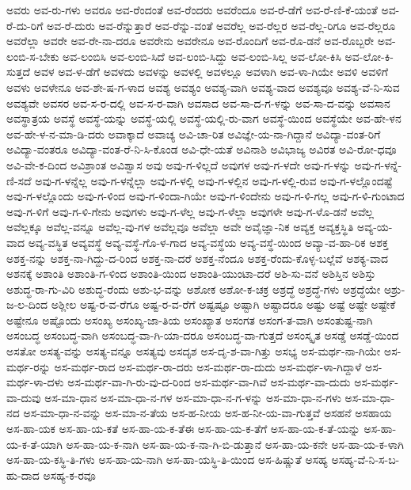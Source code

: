 {ಅವರು
ಅವ-ರು-ಗಳು
ಅವರೂ
ಅವ-ರೆಂದಂತೆ
ಅವ-ರೆಂದರು
ಅವರೆಂದೂ
ಅವ-ರೆ-ಡೆಗೆ
ಅವ-ರೆ-ಣಿ-ಕೆ-ಯಂತೆ
ಅವ-ರೆ-ದು-ರಿಗೆ
ಅವ-ರೆ-ದುರು
ಅವ-ರೆನ್ನುತ್ತಾರೆ
ಅವ-ರೆನ್ನು-ವಂತೆ
ಅವರೆಲ್ಲ
ಅವ-ರೆಲ್ಲರ
ಅವ-ರೆಲ್ಲ-ರಿಗೂ
ಅವ-ರೆಲ್ಲರೂ
ಅವರೆಲ್ಲಾ
ಅವರೇ
ಅವ-ರೇ-ನಾ-ದರೂ
ಅವರೇನು
ಅವರೇನೂ
ಅವ-ರೊಂದಿಗೆ
ಅವ-ರೊ-ಡನೆ
ಅವ-ರೊಬ್ಬರೇ
ಅವ-ಲಂಬಿ-ಸ-ಬೇಕು
ಅವ-ಲಂಬಿಸಿ
ಅವ-ಲಂಬಿ-ಸಿದೆ
ಅವ-ಲಂಬಿ-ಸಿದ್ದು
ಅವ-ಲಂಬಿ-ಸಿಲ್ಲ
ಅವ-ಲೋ-ಕಿಸಿ
ಅವ-ಲೋ-ಕಿ-ಸುತ್ತದೆ
ಅವಳ
ಅವ-ಳ-ಡೆಗೆ
ಅವಳದು
ಅವಳನ್ನು
ಅವಳಲ್ಲಿ
ಅವಳಲ್ಲೂ
ಅವಳಾಗಿ
ಅವ-ಳಾ-ಗಿಯೇ
ಅವಳಿ
ಅವಳಿಗೆ
ಅವಳು
ಅವಳೇನೂ
ಅವ-ಶೇ-ಷ-ಗ-ಳಾದ
ಅವಶ್ಯ
ಅವಶ್ಯಂ
ಅವಶ್ಯ-ವಾಗಿ
ಅವಶ್ಯ-ವಾದ
ಅವಶ್ಯವೂ
ಅವಶ್ಯ-ವೆ-ನಿ-ಸುವ
ಅವಶ್ಯವೇ
ಅವಸರ
ಅವ-ಸ-ರ-ದಲ್ಲಿ
ಅವ-ಸ-ರ-ವಾಗಿ
ಅವಸಾದ
ಅವ-ಸಾ-ದ-ಗ-ಳನ್ನು
ಅವ-ಸಾ-ದ-ವನ್ನು
ಅವಸಾನ
ಅವಸ್ಥಾತ್ರಯ
ಅವಸ್ಥೆ
ಅವಸ್ಥೆ-ಯನ್ನು
ಅವಸ್ಥೆ-ಯಲ್ಲಿ
ಅವಸ್ಥೆ-ಯಲ್ಲಿ-ರು-ವಾಗ
ಅವಸ್ಥೆ-ಯಿಂದ
ಅವಸ್ಥೆಯೇ
ಅವ-ಹೇ-ಳನ
ಅವ-ಹೇ-ಳ-ನ-ಮಾ-ಡಿ-ದರು
ಅವಾಕ್ಕಾದೆ
ಅವಾಚ್ಯ
ಅವಿ-ಚಾ-ರಿತ
ಅವಿಜ್ಞೇ-ಯ-ನಾ-ಗಿದ್ದಾನೆ
ಅವಿದ್ಯಾ-ವಂತ-ರಿಗೆ
ಅವಿದ್ಯಾ-ವಂತರೂ
ಅವಿದ್ಯಾ-ವಂತ-ರೆ-ನಿ-ಸಿ-ಕೊಂಡ
ಅವಿ-ಧೇ-ಯತೆ
ಅವಿನಾಶಿ
ಅವಿಭಾಜ್ಯ
ಅವಿರತ
ಅವಿ-ರೋ-ಧವೂ
ಅವಿ-ವೇ-ಕ-ದಿಂದ
ಅವಿಶ್ರಾಂತ
ಅವಿಶ್ವಾಸ
ಅವು
ಅವು-ಗ-ಳಿಲ್ಲದೆ
ಅವುಗಳ
ಅವು-ಗ-ಳದೇ
ಅವು-ಗ-ಳನ್ನು
ಅವು-ಗ-ಳನ್ನೆ-ಣಿ-ಸದೆ
ಅವು-ಗ-ಳನ್ನೆಲ್ಲ
ಅವು-ಗ-ಳನ್ನೆಲ್ಲಾ
ಅವು-ಗ-ಳಲ್ಲಿ
ಅವು-ಗ-ಳಲ್ಲಿನ
ಅವು-ಗ-ಳಲ್ಲಿ-ರುವ
ಅವು-ಗ-ಳಲ್ಲೊಂದಷ್ಟೆ
ಅವು-ಗ-ಳಲ್ಲೊಂದು
ಅವು-ಗ-ಳಿಂದ
ಅವು-ಗ-ಳಿಂದಾ-ಗಿಯೇ
ಅವು-ಗ-ಳಿಂದೇನು
ಅವು-ಗ-ಳಿ-ಗಲ್ಲ
ಅವು-ಗ-ಳಿ-ಗುಂಟಾದ
ಅವು-ಗ-ಳಿಗೆ
ಅವು-ಗ-ಳಿ-ಗೇನು
ಅವುಗಳು
ಅವು-ಗ-ಳೆಲ್ಲ
ಅವು-ಗ-ಳೆಲ್ಲಾ
ಅವುಗಳೇ
ಅವು-ಗ-ಳೊ-ಡನೆ
ಅವೆಲ್ಲ
ಅವೆಲ್ಲಕ್ಕೂ
ಅವೆಲ್ಲ-ವನ್ನೂ
ಅವೆಲ್ಲ-ವು-ಗಳ
ಅವೆಲ್ಲವೂ
ಅವೆಲ್ಲಾ
ಅವೇ
ಅವೈಜ್ಞಾ-ನಿಕ
ಅವ್ಯಕ್ತ
ಅವ್ಯಕ್ತಸ್ಥಿತಿ
ಅವ್ಯ-ಯ-ವಾದ
ಅವ್ಯ-ವಸ್ಥಿತ
ಅವ್ಯವಸ್ಥೆ
ಅವ್ಯ-ವಸ್ಥೆ-ಗೊ-ಳ-ಗಾದ
ಅವ್ಯ-ವಸ್ಥೆಯ
ಅವ್ಯ-ವಸ್ಥೆ-ಯಿಂದ
ಅವ್ಯಾ-ವ-ಹಾ-ರಿಕ
ಅಶಕ್ತ
ಅಶಕ್ತ-ನನ್ನು
ಅಶಕ್ತ-ನಾ-ಗಿದ್ದು-ದ-ರಿಂದ
ಅಶಕ್ತ-ನಾ-ದರೆ
ಅಶಕ್ತ-ನೆಂದೂ
ಅಶಕ್ತ-ರೆಂದು-ಕೊಳ್ಳ-ಬಲ್ಲೆವೆ
ಅಶಕ್ಯ-ವಾದ
ಅಶನಕ್ಕೆ
ಅಶಾಂತಿ
ಅಶಾಂತಿ-ಗ-ಳಿಂದ
ಅಶಾಂತಿ-ಯಿಂದ
ಅಶಾಂತಿ-ಯುಂಟಾ-ದರೆ
ಅಶಿ-ಸು-ವನೆ
ಅಶಿಸ್ತಿನ
ಅಶಿಸ್ತು
ಅಶುದ್ಧ-ರಾ-ಗು-ವಿರಿ
ಅಶುದ್ಧ-ರೆಂದು
ಅಶು-ಭ-ವನ್ನು
ಅಶೋಕ
ಅಶೋ-ಕ-ಚಕ್ರ
ಅಶ್ರದ್ಧೆ
ಅಶ್ರದ್ಧೆ-ಗಳು
ಅಶ್ರದ್ಧೆಯೇ
ಅಶ್ರು-ಜ-ಲ-ದಿಂದ
ಅಶ್ಲೀಲ
ಅಷ್ಟ-ರ-ವ-ರೆಗೂ
ಅಷ್ಟ-ರ-ವ-ರೆಗೆ
ಅಷ್ಟಷ್ಟೂ
ಅಷ್ಟಾಗಿ
ಅಷ್ಟಾದರೂ
ಅಷ್ಟು
ಅಷ್ಟೆ
ಅಷ್ಟೇ
ಅಷ್ಟೇಕೆ
ಅಷ್ಟೇನೂ
ಅಷ್ಟೊಂದು
ಅಸಂಖ್ಯ
ಅಸಂಖ್ಯ-ಜಾ-ತಿಯ
ಅಸಂಖ್ಯಾತ
ಅಸಂಗತ
ಅಸಂಗ-ತ-ವಾಗಿ
ಅಸಂತುಷ್ಟ-ನಾಗಿ
ಅಸಂಬದ್ಧ
ಅಸಂಬದ್ಧ-ವಾಗಿ
ಅಸಂಬದ್ಧ-ವಾ-ಗಿ-ಯಾ-ದರೂ
ಅಸಂಬದ್ಧ-ವಾ-ಗುತ್ತದೆ
ಅಸಂಸ್ಕೃತ
ಅಸಡ್ಡೆ
ಅಸಡ್ಡೆ-ಯಿಂದ
ಅಸತೋ
ಅಸತ್ಯ-ವನ್ನು
ಅಸತ್ಯ-ವನ್ನೂ
ಅಸತ್ಯವು
ಅಸದೃಶ
ಅಸ-ದೃ-ಶ-ವಾ-ಗಿತ್ತು
ಅಸಭ್ಯ
ಅಸ-ಮರ್ಥ-ನಾ-ಗಿಯೇ
ಅಸ-ಮರ್ಥ-ರನ್ನು
ಅಸ-ಮರ್ಥ-ರಾದ
ಅಸ-ಮರ್ಥ-ರಾ-ದರು
ಅಸ-ಮರ್ಥ-ರಾ-ದುದು
ಅಸ-ಮರ್ಥ-ಳಾ-ಗಿದ್ದಾಳೆ
ಅಸ-ಮರ್ಥ-ಳಾ-ದಳು
ಅಸ-ಮರ್ಥ-ವಾ-ಗಿ-ರು-ವು-ದ-ರಿಂದ
ಅಸ-ಮರ್ಥ-ವಾ-ಗಿವೆ
ಅಸ-ಮರ್ಥ-ವಾ-ದುದು
ಅಸ-ಮರ್ಥ-ವಾ-ದುವು
ಅಸ-ಮಾ-ಧಾನ
ಅಸ-ಮಾ-ಧಾ-ನ-ಗಳ
ಅಸ-ಮಾ-ಧಾ-ನ-ಗ-ಳನ್ನು
ಅಸ-ಮಾ-ಧಾ-ನ-ಗಳು
ಅಸ-ಮಾ-ಧಾ-ನದ
ಅಸ-ಮಾ-ಧಾ-ನ-ವನ್ನು
ಅಸ-ಮಾ-ನ-ತೆಯ
ಅಸ-ಹ-ನೀಯ
ಅಸ-ಹ-ನೀ-ಯ-ವಾ-ಗುತ್ತವೆ
ಅಸಹನೆ
ಅಸಹಾಯ
ಅಸ-ಹಾ-ಯಕ
ಅಸ-ಹಾ-ಯ-ಕತೆ
ಅಸ-ಹಾ-ಯ-ಕ-ತೆಈ
ಅಸ-ಹಾ-ಯ-ಕ-ತೆಗೆ
ಅಸ-ಹಾ-ಯ-ಕ-ತೆ-ಯನ್ನು
ಅಸ-ಹಾ-ಯ-ಕ-ತೆ-ಯಾಗಿ
ಅಸ-ಹಾ-ಯ-ಕ-ನಾಗಿ
ಅಸ-ಹಾ-ಯ-ಕ-ನಾ-ಗಿ-ಬಿ-ಡುತ್ತಾನೆ
ಅಸ-ಹಾ-ಯ-ಕನೇ
ಅಸ-ಹಾ-ಯ-ಕ-ಳಾಗಿ
ಅಸ-ಹಾ-ಯ-ಕಸ್ಥಿ-ತಿ-ಗಳು
ಅಸ-ಹಾ-ಯ-ನಾಗಿ
ಅಸ-ಹಾ-ಯಸ್ಥಿ-ತಿ-ಯಿಂದ
ಅಸ-ಹಿಷ್ಣುತೆ
ಅಸಹ್ಯ
ಅಸಹ್ಯ-ವೆ-ನಿ-ಸ-ಬ-ಹು-ದಾದ
ಅಸಹ್ಯ-ಕ-ರವೂ
}
